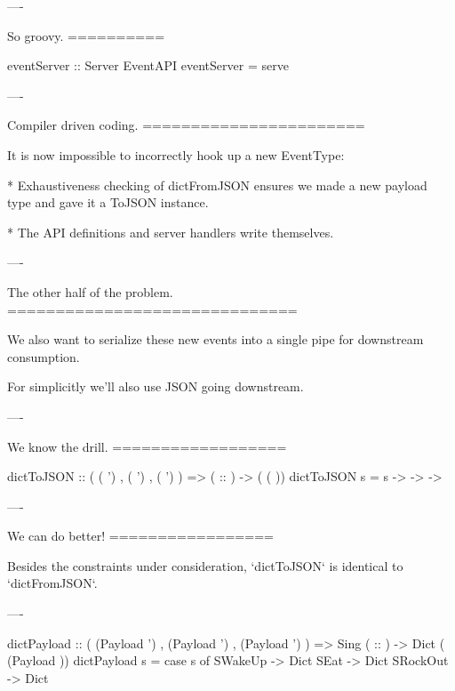 ----

So groovy.
==========

\begin{raw}
  eventServer :: Server EventAPI
  eventServer = serve 
\end{raw}

----

Compiler driven coding.
=======================

It is now impossible to incorrectly hook up a new EventType:

* Exhaustiveness checking of dictFromJSON ensures we made a new payload type and gave it a ToJSON instance.

* The API definitions and server handlers write themselves.

----

The other half of the problem.
==============================

We also want to serialize these new events into a single pipe for downstream consumption.

For simplicitly we'll also use JSON going downstream.

----

We know the drill.
==================

\begin{custom}
  dictToJSON :: (  ( ')
                ,  ( ')
                ,  ( ')
                )
             =>  ( :: )
             ->  ( ( ))
  dictToJSON s =  s 
      -> 
         -> 
     -> 
\end{custom}

----

We can do better!
=================

Besides the constraints under consideration, `dictToJSON` is identical to `dictFromJSON`.

----

\begin{raw}

  dictPayload :: (  (Payload ')
                 ,  (Payload ')
                 ,  (Payload ')
                 )
              => Sing ( :: )
              -> Dict ( (Payload ))
  dictPayload s = case s of
    SWakeUp  -> Dict
    SEat     -> Dict
    SRockOut -> Dict
\end{raw}

